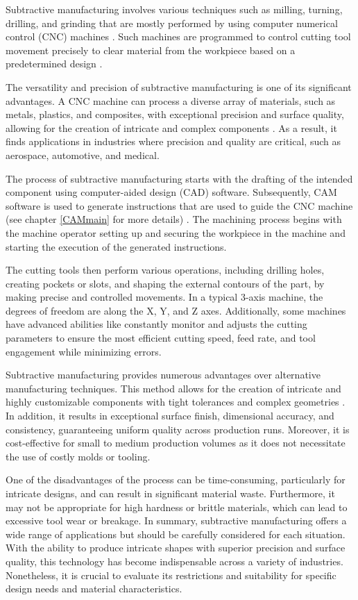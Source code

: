 Subtractive manufacturing involves various techniques such as milling, turning, drilling, and grinding that are mostly performed by using computer numerical control (CNC) machines \cite{Kumar.2020}. Such machines are programmed to control cutting tool movement precisely to clear material from the workpiece based on a predetermined design \cite{Amanullah.2017}.

The versatility and precision of subtractive manufacturing is one of its significant advantages. A CNC machine can process a diverse array of materials, such as metals, plastics, and composites, with exceptional precision and surface quality, allowing for the creation of intricate and complex components \cite{Tomaz.2021}. As a result, it finds applications in industries where precision and quality are critical, such as aerospace, automotive, and medical.

The process of subtractive manufacturing starts with the drafting of the intended component using computer-aided design (CAD) software. Subsequently, CAM software is used to generate instructions that are used to guide the CNC machine (see chapter \ref{CAMmain} for more details) . The machining process begins with the machine operator setting up and securing the workpiece in the machine and starting the execution of the generated instructions.

The cutting tools then perform various operations, including drilling holes, creating pockets or slots, and shaping the external contours of the part, by making precise and controlled movements. In a typical 3-axis machine, the degrees of freedom are along the X, Y, and Z axes. Additionally, some machines have advanced abilities like constantly monitor and adjusts the cutting parameters to ensure the most efficient cutting speed, feed rate, and tool engagement while minimizing errors.


Subtractive manufacturing provides numerous advantages over alternative manufacturing techniques. This method allows for the creation of intricate and highly customizable components with tight tolerances and complex geometries \cite{Jayawardane.2023}. In addition, it results in exceptional surface finish, dimensional accuracy, and consistency, guaranteeing uniform quality across production runs. Moreover, it is cost-effective for small to medium production volumes as it does not necessitate the use of costly molds or tooling.

One of the disadvantages of the process can be time-consuming, particularly for intricate designs, and can result in significant material waste. Furthermore, it may not be appropriate for high hardness or brittle materials, which can lead to excessive tool wear or breakage. In summary, subtractive manufacturing offers a wide range of applications but should be carefully considered for each situation. With the ability to produce intricate shapes with superior precision and surface quality, this technology has become indispensable across a variety of industries. Nonetheless, it is crucial to evaluate its restrictions and suitability for specific design needs and material characteristics.


